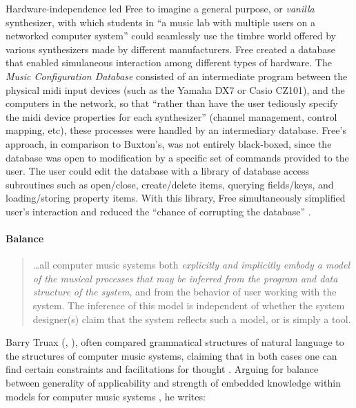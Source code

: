 	Hardware-independence led Free to imagine a general purpose, or \textit{vanilla} synthesizer, with which students in ``a music lab with multiple users on a networked computer system'' \parencite[127]{DBLP:conf/icmc/FreeV88} could seamlessly use the timbre world offered by various synthesizers made by different manufacturers. Free created a database that enabled simulaneous interaction among different types of hardware. The \textit{Music Configuration Database} consisted of an intermediate program between the physical \gls{midi} input devices (such as the Yamaha DX7 or Casio CZ101), and the computers in the network, so that ``rather than have the user tediously specify the \gls{midi} device properties for each synthesizer'' \parencite[133]{DBLP:conf/icmc/FreeV88} (channel management, control mapping, etc), these processes were handled by an intermediary database. Free's approach, in comparison to Buxton's, was not entirely black-boxed, since the database was open to modification by a specific set of commands provided to the user. The user could edit the database with a library of database access subroutines such as open/close, create/delete items, querying fields/keys, and loading/storing property items. With this library, Free simultaneously simplified user's interaction and reduced the ``chance of corrupting the database'' \parencite[137]{DBLP:conf/icmc/FreeV88}. 

	\paragraph{Balance}
	\label{computer:balance}


	\begin{quote}
		\dots all computer music systems both \textit{explicitly and implicitly embody a model of the musical processes that may be inferred from the program and data structure of the system}, and from the behavior of user working with the system. The inference of this model is independent of whether the system designer(s) claim that the system reflects such a model, or is simply a tool. \im \parencite[230-231]{Tru76:ACo}
	\end{quote}

	Barry Truax (\cite{Tru73:The,Tru76:ACo, Tru80:The}, \cite[Chapter~8]{Emm86:The}), often compared grammatical structures of natural language to the structures of computer music systems, claiming that in both cases one can find certain constraints and facilitations for thought \parencite[156]{Emm86:The}. Arguing for balance between generality of applicability and strength of embedded knowledge within models for computer music systems , he writes:

